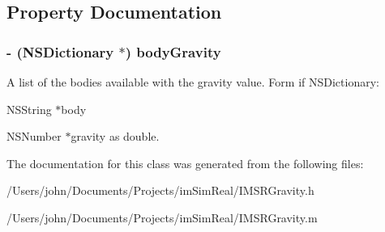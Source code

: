 \subsection{Property Documentation}
\hypertarget{interface_i_m_s_r_gravity_10084c6f12251d97bf8238a05990a9d6}{
\subsubsection[{bodyGravity}]{\setlength{\rightskip}{0pt plus 5cm}- (NSDictionary $\ast$) bodyGravity}}
\label{interface_i_m_s_r_gravity_10084c6f12251d97bf8238a05990a9d6}


A list of the bodies available with the gravity value. Form if NSDictionary:\par
 NSString $\ast$body\par
 NSNumber $\ast$gravity as double. 

The documentation for this class was generated from the following files:\begin{CompactItemize}
\item 
/Users/john/Documents/Projects/imSimReal/IMSRGravity.h\item 
/Users/john/Documents/Projects/imSimReal/IMSRGravity.m\end{CompactItemize}
